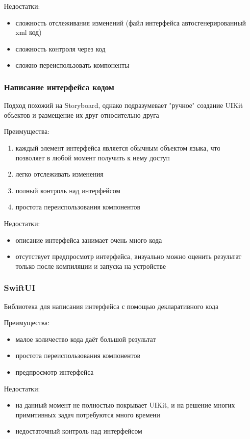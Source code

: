       \noindent Недостатки:
      \begin{itemize}
        \item сложность отслеживания изменений (файл интерфейса автосгенерированный xml код)
        \item сложность контроля через код
        \item сложно переиспользовать компоненты
      \end{itemize}



    \subsubsection{Написание интерфейса кодом}
      Подход похожий на Storyboard, однако подразумевает "ручное" создание UIKit объектов и размещение их друг относительно друга

      \noindent Преимущества:
      \begin{enumerate}
        \item каждый элемент интерфейса является обычным объектом языка, что позволяет в любой момент получить к нему доступ
        \item легко отслеживать изменения
        \item полный контроль над интерфейсом
        \item простота переиспользования компонентов
      \end{enumerate}

      \noindent Недостатки:
      \begin{itemize}
        \item описание интерфейса занимает очень много кода
        \item отсутствует предпросмотр интерфейса, визуально можно оценить результат только после компиляции и запуска на устройстве
      \end{itemize}


    \subsubsection{SwiftUI}
      Библиотека для написания интерфейса с помощью декларативного кода

      \noindent Преимущества:
      \begin{itemize}
        \item малое количество кода даёт большой результат
        \item простота переиспользования компонентов
        \item предпросмотр интерфейса
      \end{itemize}
      \noindent Недостатки:
      \begin{itemize}
        \item на данный момент не полностью покрывает UIKit, и на решение многих примитивных задач потребуются много времени
        \item недостаточный контроль над интерфейсом
      \end{itemize}


